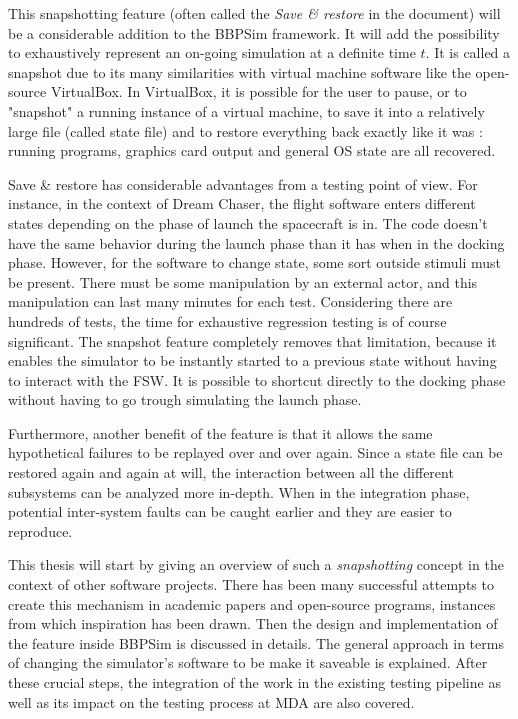 This snapshotting feature (often called the \textit{Save \& restore} in the document) will be a considerable addition to the \gls{BBPSim} framework. It will add the possibility to exhaustively represent an on-going simulation at a definite time $t$. It is called a snapshot due to its many similarities with virtual machine software like the open-source VirtualBox. In VirtualBox, it is possible for the user to pause, or to "snapshot" a running instance of a virtual machine, to save it into a relatively large file (called state file) and to restore everything back exactly like it was : running programs, graphics card output and general OS state are all recovered.  

Save \& restore has considerable advantages from a testing point of view. For instance, in the context of Dream Chaser, the flight software enters different states depending on the phase of launch the spacecraft is in. The code doesn't have the same behavior during the launch phase than it has when in the docking phase. However, for the software to change state, some sort outside stimuli must be present. There must be some manipulation by an external actor, and this manipulation can last many minutes for each test. Considering there are hundreds of tests, the time for exhaustive regression testing is of course significant. The snapshot feature completely removes that limitation, because it enables the simulator to be instantly started to a previous state without having to interact with the \gls{FSW}. It is possible to shortcut directly to the docking phase without having to go trough simulating the launch phase. 

Furthermore, another benefit of the feature is that it allows the same hypothetical failures to be replayed over and over again. Since a state file can be restored again and again at will, the interaction between all the different subsystems can be analyzed more in-depth. When in the integration phase, potential inter-system faults can be caught earlier and they are easier to reproduce.  

This thesis will start by giving an overview of such a \textit{snapshotting} concept in the context of other software projects. There has been many successful attempts to create this mechanism in academic papers and open-source programs, instances from which inspiration has been drawn. Then the design and implementation of the feature inside \gls{BBPSim} is discussed in details. The general approach in terms of changing the simulator's software to be make it saveable is explained. After these crucial steps, the integration of the work in the existing testing pipeline as well as its impact on the testing process at MDA are also covered. 
